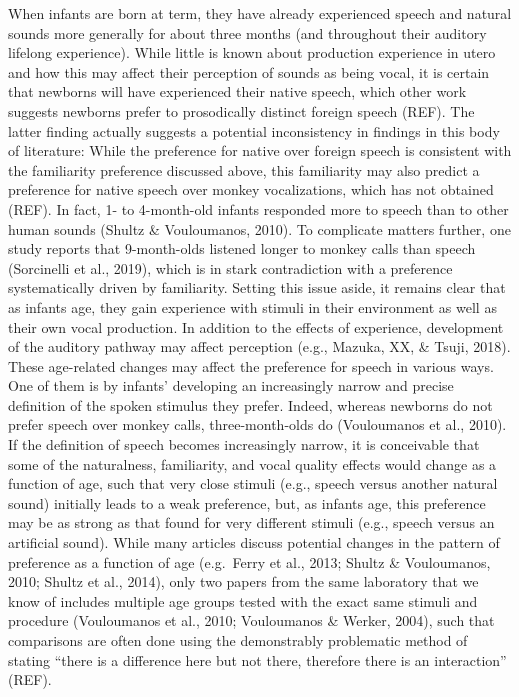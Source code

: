 \documentclass[]{apa6}
\begin{document}
When infants are born at term, they have already experienced speech and
natural sounds more generally for about three months (and throughout
their auditory lifelong experience). While little is known about
production experience in utero and how this may affect their perception
of sounds as being vocal, it is certain that newborns will have
experienced their native speech, which other work suggests newborns
prefer to prosodically distinct foreign speech (REF). The latter finding
actually suggests a potential inconsistency in findings in this body of
literature: While the preference for native over foreign speech is
consistent with the familiarity preference discussed above, this
familiarity may also predict a preference for native speech over monkey
vocalizations, which has not obtained (REF). In fact, 1- to 4-month-old
infants responded more to speech than to other human sounds (Shultz \&
Vouloumanos, 2010). To complicate matters further, one study reports
that 9-month-olds listened longer to monkey calls than speech
(Sorcinelli et al., 2019), which is in stark contradiction with a
preference systematically driven by familiarity. Setting this issue
aside, it remains clear that as infants age, they gain experience with
stimuli in their environment as well as their own vocal production. In
addition to the effects of experience, development of the auditory
pathway may affect perception (e.g., Mazuka, XX, \& Tsuji, 2018). These
age-related changes may affect the preference for speech in various
ways. One of them is by infants' developing an increasingly narrow and
precise definition of the spoken stimulus they prefer. Indeed, whereas
newborns do not prefer speech over monkey calls, three-month-olds do
(Vouloumanos et al., 2010). If the definition of speech becomes
increasingly narrow, it is conceivable that some of the naturalness,
familiarity, and vocal quality effects would change as a function of
age, such that very close stimuli (e.g., speech versus another natural
sound) initially leads to a weak preference, but, as infants age, this
preference may be as strong as that found for very different stimuli
(e.g., speech versus an artificial sound). While many articles discuss
potential changes in the pattern of preference as a function of age
(e.g.~Ferry et al., 2013; Shultz \& Vouloumanos, 2010; Shultz et al.,
2014), only two papers from the same laboratory that we know of includes
multiple age groups tested with the exact same stimuli and procedure
(Vouloumanos et al., 2010; Vouloumanos \& Werker, 2004), such that
comparisons are often done using the demonstrably problematic method of
stating \enquote{there is a difference here but not there, therefore
there is an interaction} (REF).
\end{document}
